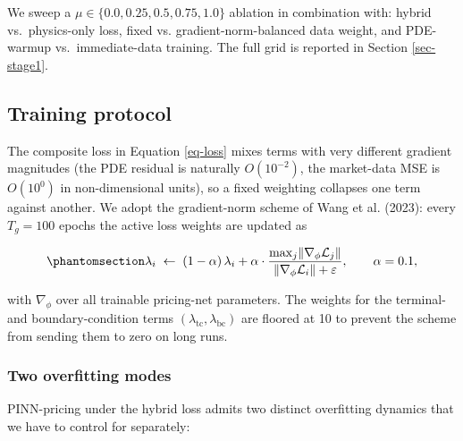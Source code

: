 \documentclass[
  11pt,
]{article}
\begin{document}
We sweep a \(\mu \in \{0.0, 0.25, 0.5, 0.75, 1.0\}\) ablation in
combination with: hybrid vs.~physics-only loss, fixed vs.
gradient-norm-balanced data weight, and PDE-warmup vs.~immediate-data
training. The full grid is reported in Section \ref{sec-stage1}.

\subsection{Training protocol}\label{sec-training}

The composite loss in Equation \ref{eq-loss} mixes terms with very
different gradient magnitudes (the PDE residual is naturally
\(O(10^{-2})\), the market-data MSE is \(O(10^{0})\) in non-dimensional
units), so a fixed weighting collapses one term against another. We
adopt the gradient-norm scheme of Wang et al. (2023): every
\(T_g{=}100\) epochs the active loss weights are updated as

\begin{equation}\phantomsection\label{eq-grad-norm}{
\lambda_i \;\leftarrow\; (1-\alpha)\,\lambda_i
+ \alpha \cdot \frac{\max_j \lVert \nabla_\phi \mathcal{L}_j \rVert}
                     {\lVert \nabla_\phi \mathcal{L}_i \rVert + \varepsilon},
\qquad \alpha = 0.1,
}\end{equation}

with \(\nabla_\phi\) over all trainable pricing-net parameters. The
weights for the terminal- and boundary-condition terms
\((\lambda_\mathrm{tc},\lambda_\mathrm{bc})\) are floored at 10 to
prevent the scheme from sending them to zero on long runs.

\subsubsection{Two overfitting modes}\label{two-overfitting-modes}

PINN-pricing under the hybrid loss admits two distinct overfitting
dynamics that we have to control for separately:
\end{document}
